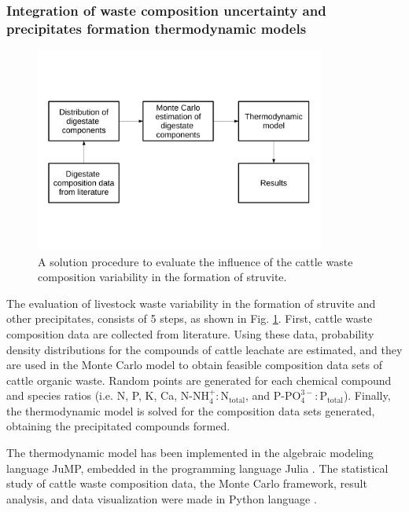 \begin{refsection}[referencesCh3]
\subsubsection{Integration of waste composition uncertainty and precipitates formation thermodynamic models}
\begin{figure}[h!]
	\begin{adjustwidth}{}{} 
		\centering
		\includegraphics[width=0.85\textwidth, trim=0 4.5cm 0 5cm, clip]{gfx/Chapter3/procedure} 
		\caption{A solution procedure to evaluate the influence of the cattle waste composition variability in the formation of struvite.} \label{fig:procedure_schema}
	\end{adjustwidth}{}
\end{figure}
The evaluation of livestock waste variability in the formation of struvite and other precipitates, consists of 5 steps, as shown in Fig. \ref{fig:procedure_schema}. First, cattle waste composition data are collected from literature. Using these data, probability density distributions for the compounds of cattle leachate are estimated, and they are used in the Monte Carlo model to obtain feasible composition data sets of cattle organic waste. Random points are generated for each chemical compound and species ratios (i.e. N, P, K, Ca, $\text{N-NH}_{4}^{+}:\text{N}_\text{total}$, and $\text{P-PO}_{4}^{3-}:\text{P}_{\text{total}}$). 
Finally, the thermodynamic model is solved for the composition data sets generated, obtaining the precipitated compounds formed.

The thermodynamic model has been implemented in the algebraic modeling language JuMP, embedded in the programming language Julia \citep{DunningHuchetteLubin2017, bezanson2017julia}. The statistical study of cattle waste composition data, the Monte Carlo framework, result analysis, and data visualization were made in Python language \citep{Python, Numpy, Matplotlib, Pandas}.


\end{refsection}
